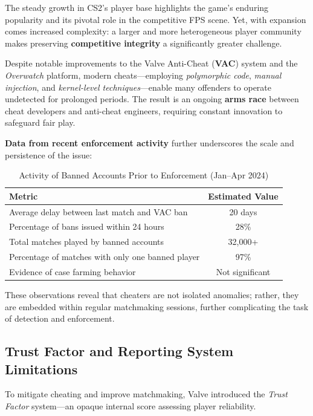 The steady growth in CS2’s player base highlights the game's enduring popularity and its pivotal role in the competitive FPS scene.  
Yet, with expansion comes increased complexity: a larger and more heterogeneous player community makes preserving \textbf{competitive integrity} a significantly greater challenge.

Despite notable improvements to the Valve Anti-Cheat (\textbf{VAC}) system and the \textit{Overwatch} platform, modern cheats—employing \textit{polymorphic code}, \textit{manual injection}, and \textit{kernel-level techniques}—enable many offenders to operate undetected for prolonged periods.  
The result is an ongoing \textbf{arms race} between cheat developers and anti-cheat engineers, requiring constant innovation to safeguard fair play.

\textbf{Data from recent enforcement activity} further underscores the scale and persistence of the issue:

\begin{table}[H]
  \centering
  \small
  \setlength{\tabcolsep}{6pt}
  \caption{Activity of Banned Accounts Prior to Enforcement (Jan--Apr 2024)}
  \label{tab:cheater-impact}
  \begin{tabular}{|p{5.2cm}|c|}
  \hline
  \textbf{Metric} & \textbf{Estimated Value} \\
  \hline
  Average delay between last match and VAC ban & 20 days \\
  \hline
  Percentage of bans issued within 24 hours & 28\% \\
  \hline
  Total matches played by banned accounts & 32,000+ \\
  \hline
  Percentage of matches with only one banned player & 97\% \\
  \hline
  Evidence of case farming behavior & Not significant \\
  \hline
  \end{tabular}
\end{table}

These observations reveal that cheaters are not isolated anomalies; rather, they are embedded within regular matchmaking sessions, further complicating the task of detection and enforcement.

\subsection{Trust Factor and Reporting System Limitations}

To mitigate cheating and improve matchmaking, Valve introduced the \textit{Trust Factor} system—an opaque internal score assessing player reliability.

